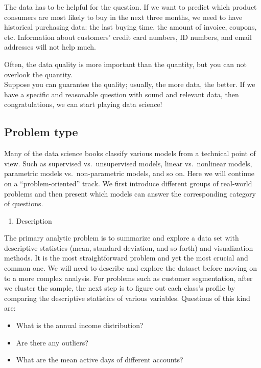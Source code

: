 \documentclass[12pt,]{krantz}
\providecommand{\tightlist}{%
  \setlength{\itemsep}{0pt}\setlength{\parskip}{0pt}}
\begin{document}
The data has to be helpful for the question. If we want to predict which product consumers are most likely to buy in the next three months, we need to have historical purchasing data: the last buying time, the amount of invoice, coupons, etc. Information about customers' credit card numbers, ID numbers, and email addresses will not help much.

Often, the data quality is more important than the quantity, but you can not overlook the quantity.\\
Suppose you can guarantee the quality; usually, the more data, the better. If we have a specific and reasonable question with sound and relevant data, then congratulations, we can start playing data science!

\hypertarget{problem-type}{%
\subsection{Problem type}\label{problem-type}}

Many of the data science books classify various models from a technical point of view. Such as supervised vs.~unsupervised models, linear vs.~nonlinear models, parametric models vs.~non-parametric models, and so on. Here we will continue on a ``problem-oriented'' track. We first introduce different groups of real-world problems and then present which models can answer the corresponding category of questions.

\begin{enumerate}
\def\labelenumi{\arabic{enumi}.}
\tightlist
\item
  Description
\end{enumerate}

The primary analytic problem is to summarize and explore a data set with descriptive statistics (mean, standard deviation, and so forth) and visualization methods. It is the most straightforward problem and yet the most crucial and common one. We will need to describe and explore the dataset before moving on to a more complex analysis. For problems such as customer segmentation, after we cluster the sample, the next step is to figure out each class's profile by comparing the descriptive statistics of various variables. Questions of this kind are:

\begin{itemize}
\tightlist
\item
  What is the annual income distribution?
\item
  Are there any outliers?
\item
  What are the mean active days of different accounts?
\end{itemize}
\end{document}
